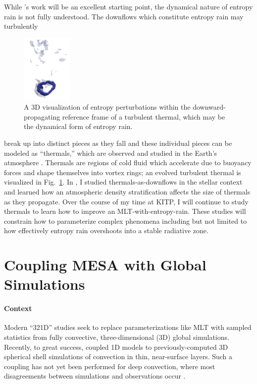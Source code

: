\documentclass[preprint, hmargin=1in, vmargin=1in]{aastex62}
\begin{document}
While \citet{brandenburg2016}'s work will be an excellent starting point, the dynamical nature of entropy rain is not fully understood.
The downflows which constitute entropy rain may turbulently
\begin{figure}
	\begin{center}
	\vspace{-28pt}
    \includegraphics[width=0.22\textwidth]{./figs/turbulent_thermal.png}
	\vspace{-16pt}
	\end{center}
    \caption{
	A 3D visualization of entropy perturbations within the downward-propagating reference frame of a turbulent thermal, which may be the dynamical form of entropy rain.
	\label{fig:thermal} }
	\vspace{-16pt}
\end{figure}
break up into distinct pieces as they fall and these individual pieces can be modeled as ``thermals,'' which are observed and studied in the Earth's atmosphere \citep{lecoanet&jeevanjee2019}.
Thermals are regions of cold fluid which accelerate due to buoyancy forces and shape themselves into vortex rings; an evolved turbulent thermal is visualized in Fig.~\ref{fig:thermal}.
In \citet{andersLB2019}, I studied thermals-as-downflows in the stellar context and learned how an atmospheric density stratification affects the size of thermals as they propagate.
Over the course of my time at KITP, I will continue to study thermals to learn how to improve an MLT-with-entropy-rain.
These studies will constrain how to parameterize complex phenomena including but not limited to how effectively entropy rain overshoots into a stable radiative zone.


\section*{\textbf{Coupling MESA with Global Simulations}}
\paragraph{Context}
Modern ``321D'' \citep[e.g.,][]{arnett&all2015} studies seek to replace parameterizations like MLT with sampled statistics from fully convective, three-dimensional (3D) global simulations.
Recently, to great success, \citet{jorgensen&weiss2019} coupled 1D models to previously-computed 3D spherical shell simulations of convection in thin, near-surface layers.
Such a coupling has not yet been performed for deep convection, where most disagreements between simulations and observations occur \citep[the Convective Conundrum,][]{hanasoge&all2015}.
\end{document}

